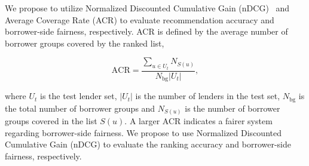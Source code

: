 We propose to utilize Normalized Discounted Cumulative Gain (nDCG)~\cite{jarvelin2002cumulated} and Average Coverage Rate (ACR) to evaluate recommendation accuracy and borrower-side fairness, respectively. ACR is defined by the average number of borrower groups covered by the ranked list,


\begin{equation}
    \text{ACR}=\frac{\sum_{u\in U_t}N_{S(u)}}{N_\text{bg}|U_t|},
\end{equation}
\vspace{0.25cm}

where $U_t$ is the test lender set, $|U_t|$ is the number of lenders in the test set, $N_\text{bg}$ is the total number of borrower groups and $N_{S(u)}$ is the number of borrower groups covered in the list $S(u)$. A larger ACR indicates a fairer system regarding borrower-side fairness. We propose to use Normalized Discounted Cumulative Gain (nDCG) to evaluate the ranking accuracy and borrower-side fairness, respectively.



